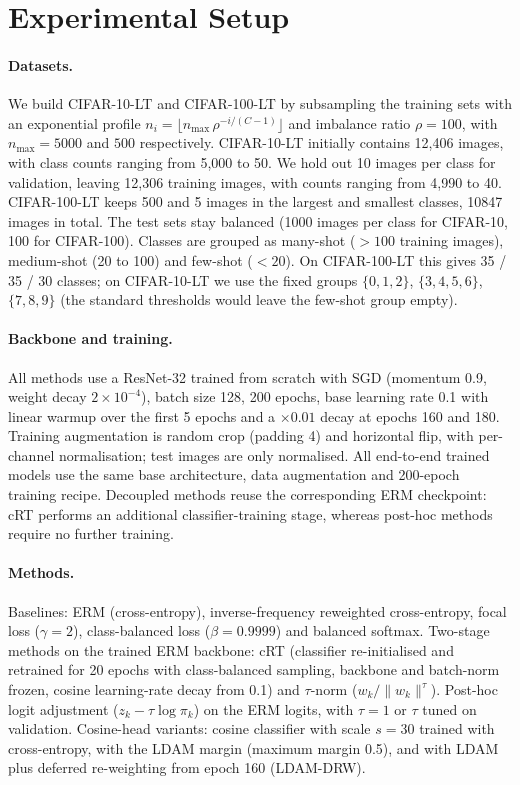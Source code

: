 \section{Experimental Setup}
\paragraph{Datasets.} We build CIFAR-10-LT and CIFAR-100-LT by subsampling the training sets with an exponential profile
$n_i = \lfloor n_{\max}\,\rho^{-i/(C-1)}\rfloor$ and imbalance ratio $\rho=100$, with $n_{\max}=5000$ and $500$ respectively.
CIFAR-10-LT initially contains 12,406 images, with class counts ranging from 5,000 to 50. We hold out 10 images per class for validation, leaving 12,306 training images, with counts ranging from 4,990 to 40.
CIFAR-100-LT keeps 500 and 5 images in the largest and smallest classes, 10847 images in total.
The test sets stay balanced (1000 images per class for CIFAR-10, 100 for CIFAR-100).
Classes are grouped as many-shot ($>100$ training images), medium-shot (20 to 100) and few-shot ($<20$).
On CIFAR-100-LT this gives 35 / 35 / 30 classes; on CIFAR-10-LT we use the fixed groups
$\{0,1,2\}$, $\{3,4,5,6\}$, $\{7,8,9\}$ (the standard thresholds would leave the few-shot group empty).
\paragraph{Backbone and training.} All methods use a ResNet-32 trained from scratch with SGD (momentum 0.9, weight decay $2\times10^{-4}$),
batch size 128, 200 epochs, base learning rate 0.1 with linear warmup over the first 5 epochs and a $\times0.01$ decay at epochs 160 and 180.
Training augmentation is random crop (padding 4) and horizontal flip, with per-channel normalisation; test images are only normalised.
All end-to-end trained models use the same base architecture, data augmentation and 200-epoch training recipe. Decoupled methods reuse the corresponding ERM checkpoint: cRT performs an additional classifier-training stage, whereas post-hoc methods require no further training.
\paragraph{Methods.} Baselines: ERM (cross-entropy), inverse-frequency reweighted cross-entropy, focal loss ($\gamma=2$),
class-balanced loss ($\beta=0.9999$) and balanced softmax. Two-stage methods on the trained ERM backbone: cRT
(classifier re-initialised and retrained for 20 epochs with class-balanced sampling, backbone and batch-norm frozen,
cosine learning-rate decay from 0.1) and $\tau$-norm ($w_k/\|w_k\|^{\tau}$). Post-hoc logit adjustment ($z_k - \tau\log\pi_k$) on the ERM
logits, with $\tau=1$ or $\tau$ tuned on validation. Cosine-head variants: cosine classifier with scale $s=30$ trained with cross-entropy,
with the LDAM margin (maximum margin 0.5), and with LDAM plus deferred re-weighting from epoch 160 (LDAM-DRW).

